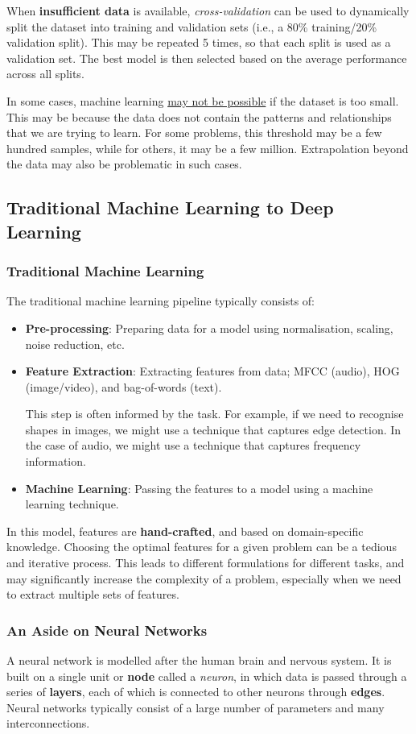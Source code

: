 \documentclass{article}
\begin{document}
When \textbf{insufficient data} is available, \textit{cross-validation}
can be used to dynamically split the dataset into training and
validation sets (i.e., a 80\% training/20\% validation split). This may
be repeated 5 times, so that each split is used as a validation set.
The best model is then selected based on the average performance across
all splits.

In some cases, machine learning \underline{may not be possible} if the
dataset is too small. This may be because the data does not contain the
patterns and relationships that we are trying to learn. For some
problems, this threshold may be a few hundred samples, while for
others, it may be a few million. Extrapolation beyond the data may also
be problematic in such cases.
\subsection{Traditional Machine Learning to Deep Learning}
\subsubsection{Traditional Machine Learning}
The traditional machine learning pipeline typically consists of:
\begin{itemize}
    \item \textbf{Pre-processing}: Preparing data for a model using
          normalisation, scaling, noise reduction, etc.
    \item \textbf{Feature Extraction}: Extracting features from data;
          MFCC (audio), HOG (image/video), and bag-of-words (text).

          This step is often informed by the task. For example, if we
          need to recognise shapes in images, we might use a technique
          that captures edge detection. In the case of audio, we might
          use a technique that captures frequency information.
    \item \textbf{Machine Learning}: Passing the features to a model
          using a machine learning technique.
\end{itemize}
In this model, features are \textbf{hand-crafted}, and based on domain-specific
knowledge. Choosing the optimal features for a given problem can be a
tedious and iterative process. This leads to different formulations for
different tasks, and may significantly increase the complexity of a
problem, especially when we need to extract multiple sets of features.
\subsubsection{An Aside on Neural Networks}
A neural network is modelled after the human brain and nervous system.
It is built on a single unit or \textbf{node} called a \textit{neuron},
in which data is passed through a series of \textbf{layers}, each of
which is connected to other neurons through \textbf{edges}. Neural
networks typically consist of a large number of parameters and many
interconnections.
\end{document}
